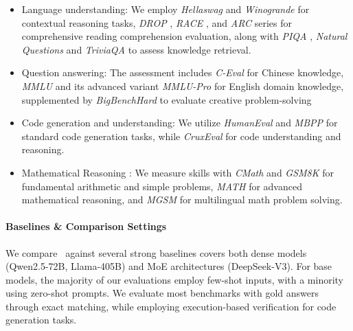 \begin{itemize}[leftmargin=*]

\item Language understanding: We employ \textit{Hellaswag} \cite{Zellers2019HellaSwagCA} and \textit{Winogrande} for contextual reasoning tasks, \textit{DROP} \cite{Dua2019DROPAR}, \textit{RACE} \cite{Lai2017RACELR}, and \textit{ARC} \cite{Clark2018ThinkYH} series for comprehensive reading comprehension evaluation, along with \textit{PIQA} \cite{Bisk2019PIQARA}, \textit{Natural Questions} \cite{Kwiatkowski2019NaturalQA} and \textit{TriviaQA} \cite{Joshi2017TriviaQAAL} to assess knowledge retrieval.

\item Question answering: The assessment includes \textit{C-Eval} \cite{Huang2023CEvalAM} for Chinese knowledge, \textit{MMLU} \cite{Hendrycks2020MeasuringMM} and its advanced variant \textit{MMLU-Pro} \cite{Wang2024MMLUProAM} for English domain knowledge, supplemented by \textit{BigBenchHard} \cite{Suzgun2022ChallengingBT} to evaluate creative problem-solving

\item Code generation and understanding: We utilize \textit{HumanEval} \cite{Chen2021EvaluatingLL} and \textit{MBPP} \cite{Austin2021ProgramSW} for standard code generation tasks, while \textit{CruxEval} \cite{Gu2024CRUXEvalAB} for code understanding and reasoning.

\item Mathematical Reasoning : We measure skills with \textit{CMath} \cite{Wei2023CMATHCY} and \textit{GSM8K} \cite{Cobbe2021TrainingVT} for fundamental arithmetic and simple problems, \textit{MATH} \cite{Hendrycks2021MeasuringMP} for advanced mathematical reasoning, and \textit{MGSM} \cite{Shi2022LanguageMA} for multilingual math problem solving.

\end{itemize}

\paragraph{Baselines \& Comparison Settings} We compare \modelname~against several strong baselines covers both dense models (Qwen2.5-72B, Llama-405B) and MoE architectures (DeepSeek-V3). For base models, the majority of our evaluations employ few-shot inputs, with a minority using zero-shot prompts. We evaluate most benchmarks with gold answers through exact matching, while employing execution-based verification for code generation tasks.

